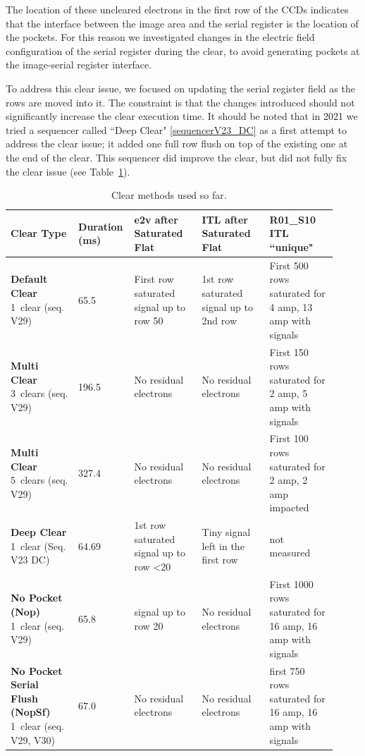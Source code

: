The location of these uncleared electrons in the first row of the
CCDs indicates that the interface between the image area and the serial register
is the location of the pockets. For this reason we investigated
changes in the electric field configuration of the serial register during the
clear, to avoid generating pockets at the image-serial register interface.


To address this clear issue, we focused on updating the serial
register field as the rows are moved into it. The constraint is that
the changes introduced should not significantly increase the clear
execution time. It should be noted that in 2021 we tried a sequencer
called ``Deep Clear" \hyperref[sequencerV23_DC]{{[}sequencerV23\_DC{]}} as a first attempt to address the clear issue; it added one full row 
flush on top of the existing one at the end of the clear. This sequencer
did improve the clear, but did  not fully fix the clear issue (see
Table~\ref{tab:clears}).

{\tiny
\begin{longtable}{|p{0.2\linewidth}|p{0.12\linewidth}|p{0.2\linewidth}|p{0.2\linewidth}|p{0.2\linewidth}|}
\caption{Clear methods used so far. \label{tab:clears}} \\
\hline
\textbf{Clear Type} & \textbf{Duration (ms)} & \textbf{e2v after Saturated Flat} & \textbf{ITL after Saturated Flat} & \textbf{R01\_S10 ITL ``unique"} \\
\hline
\endfirsthead

\endhead

\hline
\endfoot

\hline
\endlastfoot

\textbf{Default Clear} 1~clear (seq. V29) & 65.5 & First row saturated signal up to row 50 & 1st row saturated signal up to 2nd row & First 500 rows saturated for 4 amp, 13 amp with signals \\
\textbf{Multi Clear} 3~clears (seq. V29) & 196.5 & No residual electrons & No residual electrons & First 150 rows saturated for 2 amp, 5 amp with signals \\
\textbf{Multi Clear} 5~clears (seq. V29) & 327.4 & No residual electrons & No residual electrons & First 100 rows saturated for 2 amp, 2 amp impacted \\
\textbf{Deep Clear} 1~clear (Seq. V23 DC) & 64.69 & 1st row saturated signal up to row <20 & Tiny signal left in the first row & not measured \\
\textbf{No Pocket (Nop)} 1~clear (seq. V29) & 65.8 & signal up to row 20 & No residual electrons & First 1000 rows saturated for 16 amp, 16 amp with signals \\
\textbf{No Pocket Serial Flush (NopSf)} 1~clear (seq. V29, V30) & 67.0 & No residual electrons & No residual electrons & first 750 rows saturated for 16 amp, 16 amp with signals \\
\end{longtable}
}

